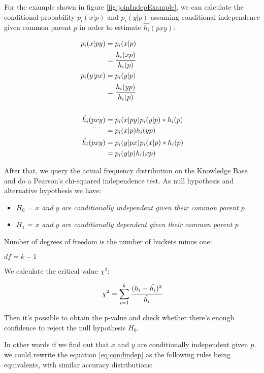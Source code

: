 For the example shown in figure \ref{fig:joinIndepExample}, we can calculate the conditional probability $p_i(x|p)$ and
$p_i(y|p)$ assuming conditional independence given common parent $p$ in order to estimate $\hat{h_i}(p x y)$:

\begin{equation}
\label{eq:condindep}
\begin{split}
 p_i(x|py) &= p_i(x|p) \\ 
 &= \cfrac{h_i(xp)}{h_i(p)} \\ 
 p_i(y|px) &= p_i(y|p) \\ 
 &= \cfrac{h_i(yp)}{h_i(p)} \\ \\ 
 \hat{h_i}(pxy) &= p_i(x|py)p_i(y|p)*h_i(p) \\ 
 &= p_i(x|p)h_i(yp) \\ 
 \hat{h_i}(pxy) &= p_i(y|px)p_i(x|p)*h_i(p) \\ 
 &= p_i(y|p)h_i(xp) 
\end{split}
\end{equation}

After that, we query the actual frequency distribution on the Knowledge Base and do a Pearson's chi-squared
independence test. As null hypothesis and alternative hypothesis we have:

\begin{itemize}
 \item $H_0$ = \emph{$x$ and $y$ are conditionally independent given their common parent $p$}
 \item $H_1$ = \emph{$x$ and $y$ are conditionally dependent given their common parent $p$} 
\end{itemize}

Number of degrees of freedom is the number of buckets minus one:

\begin{center}
 $df=k-1$
\end{center}

We calculate the critical value $\chi^2$:

\begin{equation}
 \chi^2=\sum_{i=1}^{k} \cfrac{(h_i - \hat{h_i})^2}{\hat{h_i}}
\end{equation}

\cite{Jaroszewicz02pruningredundant}

Then it's possible to obtain the p-value and check whether there's enough confidence to reject the null hypothesis
$H_0$. 


In other words if we find out that $x$ and $y$ are conditionally independent given $p$, we could rewrite the equation
\ref{eq:condindep} as the following rules being equivalents, with similar accuracy distributions:

